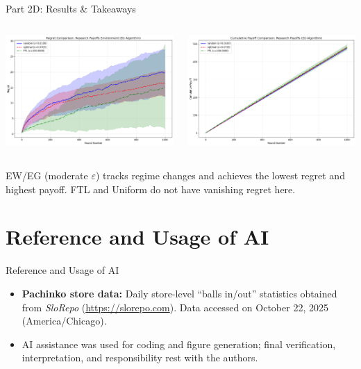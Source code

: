 \documentclass{beamer}
\begin{document}
\begin{frame}{Part 2D: Results \& Takeaways}
\begin{columns}[T,onlytextwidth]
  \centering
  \includegraphics[width=\linewidth]{332Project2/figures/RP_regret.png}

  \centering
  \includegraphics[width=\linewidth]{332Project2/figures/RP_payoff.png}
\end{columns}
\vspace{0.3em}
\small EW/EG (moderate $\varepsilon$) tracks regime changes and achieves the lowest regret and highest payoff. FTL and Uniform do not have vanishing regret here.
\end{frame}

\section{Reference and Usage of AI}

\begin{frame}{Reference and Usage of AI}
\begin{itemize}
    \item \textbf{Pachinko store data:} Daily store-level ``balls in/out'' statistics obtained from \emph{SloRepo} (\url{https://slorepo.com}). Data accessed on October 22, 2025 (America/Chicago).
    \item AI assistance was used for coding and figure generation; final verification, interpretation, and responsibility rest with the authors.
\end{itemize}
\end{frame}
\end{document}
